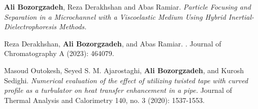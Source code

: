   \shorthandoff{:}
\begin{scholarship}

  {
    \label{pub:bozorgzadeh2024}
    \textbf{Ali Bozorgzadeh}, Reza Derakhshan and Abas Ramiar.
    \itshape Particle Focusing and Separation in a Microchannel with a Viscoelastic Medium Using Hybrid Inertial-Dielectrophoresis Methods.
  }

  {
    \label{pub:derakhshan2023}
    Reza Derakhshan, \textbf{Ali Bozorgzadeh}, and Abas Ramiar.
    .
    Journal of Chromatography A (2023): 464079.
  }

  {
    Masoud Outokesh, Seyed S. M. Ajarostaghi, \textbf{Ali Bozorgzadeh}, and Kurosh Sedighi.
     {\itshape Numerical evaluation of the effect of utilizing twisted tape with curved profile as a turbulator on heat transfer enhancement in a pipe.}
    Journal of Thermal Analysis and Calorimetry 140, no. 3 (2020): 1537-1553.
  }
  \shorthandon{:}
\end{scholarship}
